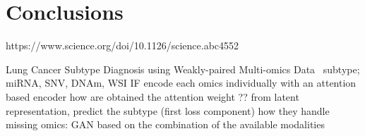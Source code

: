 \documentclass[../main.tex]{subfiles}
\begin{document}
\chapter{Conclusions}
\minitocpage

https://www.science.org/doi/10.1126/science.abc4552

Lung Cancer Subtype Diagnosis using Weakly-paired Multi-omics Data~\cite{Wang2022}
subtype; miRNA, SNV, DNAm, WSI 
IF
encode each omics individually with an attention based encoder
how are obtained the attention weight ??
from latent representation, predict the subtype (first loss component)
how they handle missing omics: GAN based on the combination of the available modalities

\end{document}
